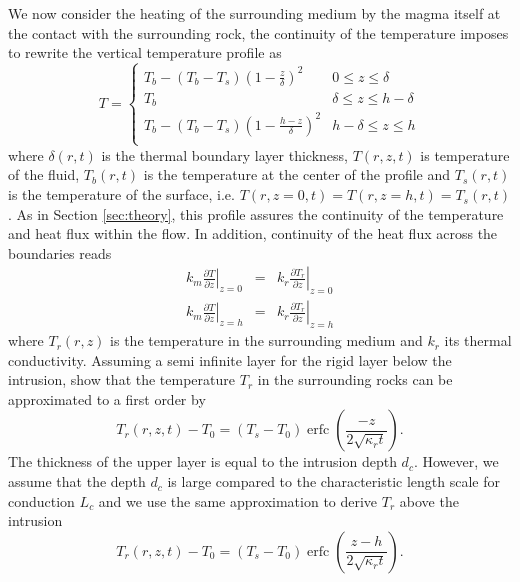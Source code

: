 We now  consider the heating  of the  surrounding medium by  the magma
itself at the contact with the surrounding rock, the continuity of the
temperature imposes to rewrite the vertical temperature profile as
\begin{equation}
  T=
  \begin{cases}
    T_b - (T_b-T_s)(1-\frac{z}{\delta})^2 & 0 \le z\le \delta \\
    T_b & \delta \le z\le h-\delta \\
    T_b - (T_b-T_s)(1-\frac{h-z}{\delta})^2 & h-\delta \le z\le h\\
  \end{cases}
  \label{C4-Temperature}
\end{equation}
where  $\delta(r,t)$   is  the   thermal  boundary   layer  thickness,
$T(r,z,t)$ is temperature of the  fluid, $T_b(r,t)$ is the temperature
at the center of the profile  and $T_s(r,t)$ is the temperature of the
surface,   i.e.   $T(r,z=0,t)=T(r,z=h,t)=T_s(r,t)$.  As   in   Section
\ref{sec:theory},  this   profile  assures   the  continuity   of  the
temperature and heat flux within  the flow. In addition, continuity of
the heat flux across the boundaries reads
\begin{eqnarray}
  k_m\left.\frac{\partial                                    T}{\partial
  z}\right|_{z=0}&=&k_r\left.\frac{\partial              T_r}{\partial
                     z}\right|_{z=0}  \label{C4-Flux1}\\
  k_m\left.\frac{\partial                                  T}{\partial
  z}\right|_{z=h}&=&k_r\left.\frac{\partial            T_r}{\partial
                     z}\right|_{z=h}
                     \label{C4-Flux2}
\end{eqnarray}
where  $T_r(r,z)$ is  the temperature  in the  surrounding medium  and
$k_r$ its  thermal conductivity.  Assuming  a semi infinite  layer for
the rigid layer below  the intrusion, \citet{Carslaw:1959wf} show that
the temperature $T_r$ in the  surrounding rocks can be approximated to
a first order by
\begin{equation}
  T_r(r,z,t)-T_0=(T_{s}-T_0)\operatorname{erfc}{\left(\frac{-z}{2\sqrt{\kappa_r t}}\right)}.
  \label{eq22}
\end{equation}
The  thickness of  the upper  layer is  equal to  the intrusion  depth
$d_c$. However,  we assume that the  depth $d_c$ is large  compared to
the characteristic  length scale for  conduction $L_c$ and we  use the
same approximation to derive $T_r$ above the intrusion
\begin{equation}
  T_r(r,z,t)-T_0=(T_{s}-T_0)\operatorname{erfc}{\left(\frac{z-h}{2\sqrt{\kappa_r t}}\right)}.
  \label{eq11}
\end{equation}
